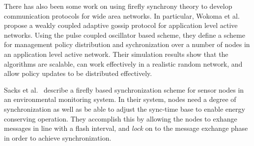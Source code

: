 There has also been some work on using firefly synchrony theory to develop communication
protocols for wide area networks. In particular, Wokoma et al.~\cite{wl02} propose
a weakly coupled adaptive gossip protocol for application level active networks. 
Using the pulse coupled oscillator based scheme, they define a scheme for
management policy distribution and sychronization over a number of nodes in an application 
level active network. Their simulation results show that the algorithms are scalable, 
can work effectively in a realistic random network, and allow policy updates
to be distributed effectively. 

Sacks et al.~\cite{sb03} describe a firefly based synchronization scheme for 
sensor nodes in an environmental monitoring system. In their system, nodes
need a degree of synchronization as well as be able to adjust the sync-time base
to enable energy conserving operation. They accomplish this by allowing the nodes
to exhange messages in line with a flash interval, and \emph{lock} on to 
the message exchange phase in order to achieve synchronization.